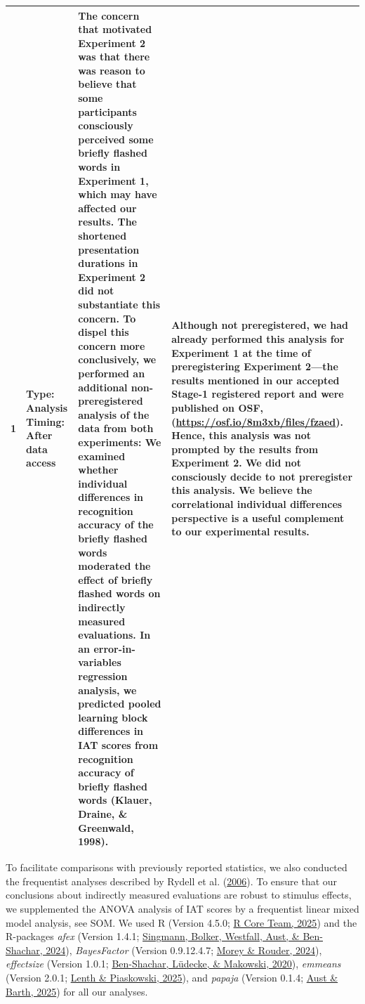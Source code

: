 \documentclass[
  man,floatsintext]{apa6}
\newenvironment{lltable}{\begin{landscape}\centering\begin{ThreePartTable}}{\end{ThreePartTable}\end{landscape}}
\begin{document}
\begin{lltable}
{\begin{longtable}{cp{3.25cm}p{10cm}p{6.75cm}}
1 & Type: Analysis \newline Timing: After data access & The concern that motivated Experiment 2 was that there was reason to believe that some participants consciously perceived some briefly flashed words in Experiment 1, which may have affected our results. The shortened presentation durations in Experiment 2 did not substantiate this concern. To dispel this concern more conclusively, we performed an additional non-preregistered analysis of the data from both experiments: We examined whether individual differences in recognition accuracy of the briefly flashed words moderated the effect of briefly flashed words on indirectly measured evaluations. In an error-in-variables regression analysis, we predicted pooled learning block differences in IAT scores from recognition accuracy of briefly flashed words (Klauer, Draine, \& Greenwald, 1998). & Although not preregistered, we had already performed this analysis for Experiment 1 at the time of preregistering Experiment 2---the results mentioned in our accepted Stage-1 registered report and were published on OSF, (\url{https://osf.io/8m3xb/files/fzaed}). Hence, this analysis was not prompted by the results from Experiment 2. We did not consciously decide to not preregister this analysis. We believe the correlational individual differences perspective is a useful complement to our experimental results.\\
\bottomrule
\end{longtable}

}

\end{lltable}

To facilitate comparisons with previously reported statistics, we also conducted the frequentist analyses described by Rydell et al. (\protect\hyperlink{ref-rydell_two_2006}{2006}).
To ensure that our conclusions about indirectly measured evaluations are robust to stimulus effects, we supplemented the ANOVA analysis of IAT scores by a frequentist linear mixed model analysis, see SOM.
We used R (Version 4.5.0; \protect\hyperlink{ref-R-base}{R Core Team, 2025}) and the R-packages \emph{afex} (Version 1.4.1; \protect\hyperlink{ref-R-afex}{Singmann, Bolker, Westfall, Aust, \& Ben-Shachar, 2024}), \emph{BayesFactor} (Version 0.9.12.4.7; \protect\hyperlink{ref-R-BayesFactor}{Morey \& Rouder, 2024}), \emph{effectsize} (Version 1.0.1; \protect\hyperlink{ref-R-effectsize}{Ben-Shachar, Lüdecke, \& Makowski, 2020}), \emph{emmeans} (Version 2.0.1; \protect\hyperlink{ref-R-emmeans}{Lenth \& Piaskowski, 2025}), and \emph{papaja} (Version 0.1.4; \protect\hyperlink{ref-R-papaja}{Aust \& Barth, 2025}) for all our analyses.
\end{document}
